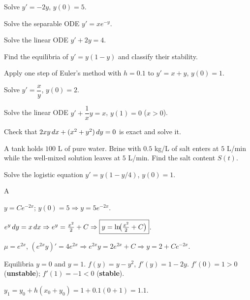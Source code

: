 \documentclass[11pt]{article}
\begin{document}
\begin{problems}
\item Solve $y' = -2y$, $y(0) = 5$.
\item Solve the separable ODE $y' = x e^{-y}$.
\item Solve the linear ODE $y' + 2y = 4$.
\item Find the equilibria of $y' = y(1 - y)$ and classify their stability.
\item Apply one step of Euler's method with $h = 0.1$ to $y' = x + y$, $y(0) = 1$.
\end{problems}

\vfill
\newpage
{}
\begin{problems}
\item Solve $y' = \dfrac{x}{y}$, $y(0) = 2$.
\item Solve the linear ODE $y' + \dfrac{1}{x} y = x$, $y(1) = 0$ ($x > 0$).
\item Check that $2xy \,dx + (x^2 + y^2) \,dy = 0$ is exact and solve it.
\item A tank holds $100$ L of pure water. Brine with $0.5$ kg/L of salt enters at $5$ L/min while the well-mixed solution leaves at $5$ L/min. Find the salt content $S(t)$.
\item Solve the logistic equation $y' = y(1 - y/4)$, $y(0) = 1$.
\end{problems}

\vfill
\newpage
{}

\begin{answers}{A}
\item $y = C e^{-2x}$; $y(0) = 5 \Rightarrow \boxed{y = 5 e^{-2x}}$.
\item $e^y \,dy = x \,dx \Rightarrow e^y = \tfrac{x^2}{2} + C \Rightarrow \boxed{y = \ln\!\bigl(\tfrac{x^2}{2} + C\bigr)}$.
\item $\mu = e^{2x}$, $(e^{2x} y)' = 4 e^{2x} \Rightarrow e^{2x} y = 2 e^{2x} + C \Rightarrow \boxed{y = 2 + C e^{-2x}}$.
\item Equilibria $y = 0$ and $y = 1$. $f(y) = y - y^2$, $f'(y) = 1 - 2y$. $f'(0) = 1 > 0$ (\textbf{unstable}); $f'(1) = -1 < 0$ (\textbf{stable}).
\item $y_1 = y_0 + h(x_0 + y_0) = 1 + 0.1(0 + 1) = \boxed{1.1}$.
\end{answers}
\end{document}
